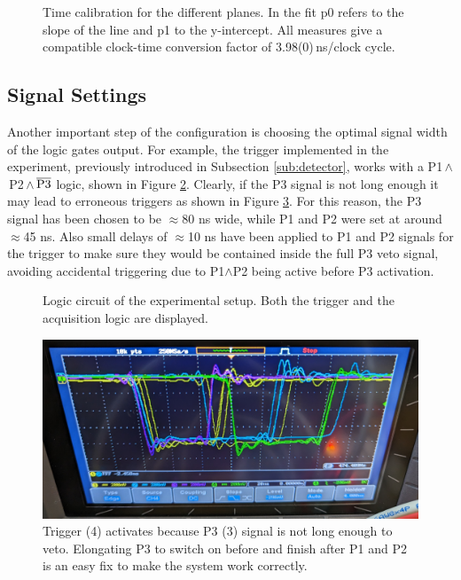 \documentclass[../main.tex]{subfiles}
\begin{document}
\begin{figure}[htb!]
 \caption[Time calibration]{Time calibration for the different planes. In the fit p0 refers to the slope of the line and p1 to the y-intercept. All measures give a compatible clock-time conversion factor of \textnormal{3.98(0)}\,\si{\nano \second}\textnormal{/clock cycle}.}%
 \label{fig:timeCalibration}%
\end{figure}

\subsection{Signal Settings}
Another important step of the configuration is choosing the optimal signal width of the logic gates output. For example, the trigger implemented in the experiment, previously introduced in Subsection \ref{sub:detector}, works with a P1\,$\land$\,P2\,$\land$\,$\overline{\textnormal{P3}}$ logic, shown in Figure \ref{fig:TriggerLogic}. Clearly, if the P3 signal is not long enough it may lead to erroneous triggers as shown in Figure \ref{fig:wrongTrigger}. For this reason, the P3 signal has been chosen to be $\approx$80 ns wide,  while P1 and P2 were set at around $\approx$45 ns. Also small delays of $\approx$10 ns have been applied to P1 and P2 signals for the trigger to make sure they would be contained inside the full P3 veto signal, avoiding accidental triggering due to P1$\land$P2 being active before P3 activation.

\begin{figure}[hbt!]
   \centering
    
    \caption{Logic circuit of the experimental setup. Both the trigger and the acquisition logic are displayed.}
    \label{fig:TriggerLogic}
\end{figure}

\begin{figure}[htb!]
    \centering
    \includegraphics[width=0.8 \linewidth]{images/wrongtrigger.jpg}
    \caption{Trigger (4) activates because P3 (3) signal is not long enough to veto. Elongating P3 to switch on before and finish after P1 and P2 is an easy fix to make the system work correctly.}
    \label{fig:wrongTrigger}
\end{figure}

\end{document}
